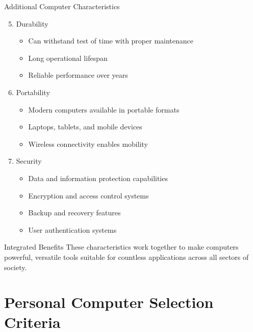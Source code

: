 \documentclass[aspectratio=169]{beamer}
\begin{document}
\begin{frame}{Additional Computer Characteristics}
    \begin{enumerate}
        \setcounter{enumi}{4}
        \item Durability
        \begin{itemize}
            \item Can withstand test of time with proper maintenance
            \item Long operational lifespan
            \item Reliable performance over years
        \end{itemize}
        
        \item Portability
        \begin{itemize}
            \item Modern computers available in portable formats
            \item Laptops, tablets, and mobile devices
            \item Wireless connectivity enables mobility
        \end{itemize}
        
        \item Security
        \begin{itemize}
            \item Data and information protection capabilities
            \item Encryption and access control systems
            \item Backup and recovery features
            \item User authentication systems
        \end{itemize}
    \end{enumerate}
    
    \vspace{0.5cm}
    \begin{alertblock}{Integrated Benefits}
    \tiny
        These characteristics work together to make computers powerful, versatile tools suitable for countless applications across all sectors of society.
    \end{alertblock}
\end{frame}

\section{Personal Computer Selection Criteria}
\end{document}
